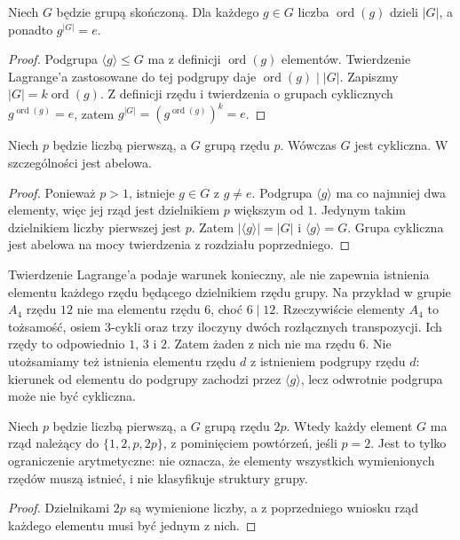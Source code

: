 \begin{wniosek}
\label{aa:wn:rzad-dzieli}
Niech $G$ będzie grupą skończoną. Dla każdego $g\in G$
liczba $\operatorname{ord}(g)$ dzieli $|G|$, a ponadto $g^{|G|}=e$.
\end{wniosek}
\begin{proof}
Podgrupa $\langle g\rangle\le G$ ma z definicji
$\operatorname{ord}(g)$ elementów. Twierdzenie Lagrange'a
zastosowane do tej podgrupy daje
$\operatorname{ord}(g)\mid |G|$.
Zapiszmy $|G|=k\operatorname{ord}(g)$.
Z definicji rzędu i twierdzenia o grupach cyklicznych
$g^{\operatorname{ord}(g)}=e$, zatem
$g^{|G|}=(g^{\operatorname{ord}(g)})^k=e$.
\end{proof}

\begin{wniosek}
\label{aa:wn:p-cykliczna}
Niech $p$ będzie liczbą pierwszą, a $G$ grupą rzędu $p$.
Wówczas $G$ jest cykliczna.
W szczególności jest abelowa.
\end{wniosek}
\begin{proof}
Ponieważ $p>1$, istnieje $g\in G$ z $g\ne e$.
Podgrupa $\langle g\rangle$ ma co najmniej dwa elementy,
więc jej rząd jest dzielnikiem $p$ większym od $1$.
Jedynym takim dzielnikiem liczby pierwszej jest $p$.
Zatem $|\langle g\rangle|=|G|$ i $\langle g\rangle=G$.
Grupa cykliczna jest abelowa na mocy twierdzenia z rozdziału poprzedniego.
\end{proof}

\begin{przyklad}
Twierdzenie Lagrange'a podaje warunek konieczny, ale nie
zapewnia istnienia elementu każdego rzędu będącego dzielnikiem
rzędu grupy. Na przykład w grupie $A_4$ rzędu $12$
nie ma elementu rzędu $6$, choć $6\mid12$.
Rzeczywiście elementy $A_4$ to tożsamość, osiem $3$-cykli
oraz trzy iloczyny dwóch rozłącznych transpozycji.
Ich rzędy to odpowiednio $1$, $3$ i $2$.
Zatem żaden z nich nie ma rzędu $6$.
Nie utożsamiamy też istnienia elementu rzędu $d$ z istnieniem
podgrupy rzędu $d$: kierunek od elementu do podgrupy zachodzi
przez $\langle g\rangle$, lecz odwrotnie podgrupa może nie być cykliczna.
\end{przyklad}

\begin{wniosek}
Niech $p$ będzie liczbą pierwszą, a $G$ grupą rzędu $2p$.
Wtedy każdy element $G$ ma rząd należący do
$\{1,2,p,2p\}$, z pominięciem powtórzeń, jeśli $p=2$.
Jest to tylko ograniczenie arytmetyczne: nie oznacza,
że elementy wszystkich wymienionych rzędów muszą istnieć,
i nie klasyfikuje struktury grupy.
\end{wniosek}
\begin{proof}
Dzielnikami $2p$ są wymienione liczby, a z poprzedniego wniosku
rząd każdego elementu musi być jednym z nich.
\end{proof}

